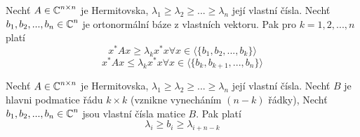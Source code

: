 \begin{theorem}
	Nechť $A \in \operatorname{\mathbb{C}}^{n \times n}$ je Hermitovska, $\lambda_1 \geq \lambda_2 \geq ... \geq \lambda_n$ její vlastní čísla.
	Nechť $b_1, b_2, ..., b_n \in \operatorname{\mathbb{C}}^n$ je ortonormální báze z vlastních vektoru. Pak pro $k = 1, 2, ..., n$ platí
	\[ x^{\ast}Ax \geq \lambda_k x^{\ast}x \forall x \in \langle \{ b_1, b_2, ..., b_k\} \rangle \]
	\[ x^{\ast}Ax \leq \lambda_k x^{\ast}x \forall x \in \langle \{ b_k, b_{k+1}, ..., b_n\} \rangle \]
\end{theorem}

\begin{theorem}
	Nechť $A \in \operatorname{\mathbb{C}}^{n \times n}$ je Hermitovska, $\lambda_1 \geq \lambda_2 \geq ... \geq \lambda_n$ její vlastní čísla.
	Nechť $B$ je hlavni podmatice řádu $k \times k$ (vznikne vynecháním $(n - k)$ řádky),
	Nechť $b_1, b_2, ..., b_n \in \operatorname{\mathbb{C}}^n$ jsou vlastní čísla matice $B$. Pak platí
	\[ \lambda_i \geq b_i \geq \lambda_{i + n - k} \]
\end{theorem}
